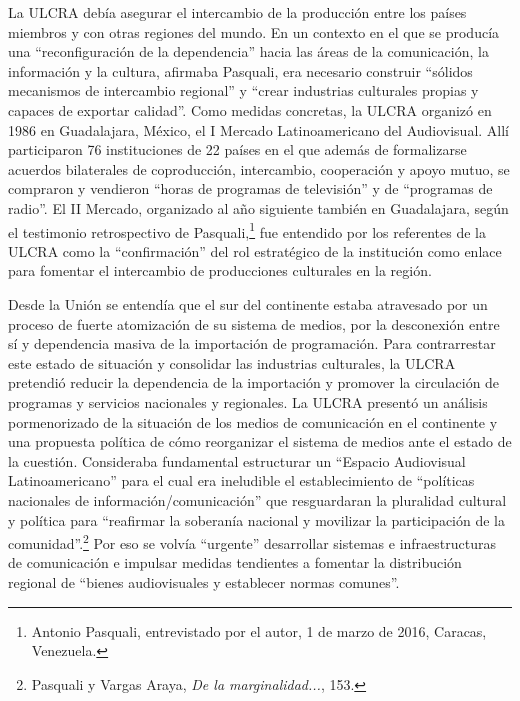 \documentclass{tufte-handout}
\begin{document}
La ULCRA debía asegurar el intercambio de la producción entre los países
miembros y con otras regiones del mundo. En un contexto en el que se
producía una ``reconfiguración de la dependencia'' hacia las áreas de la
comunicación, la información y la cultura, afirmaba Pasquali, era
necesario construir ``sólidos mecanismos de intercambio regional'' y
``crear industrias culturales propias y capaces de exportar calidad''.
Como medidas concretas, la ULCRA organizó en 1986 en Guadalajara,
México, el I Mercado Latinoamericano del Audiovisual. Allí participaron
76 instituciones de 22 países en el que además de formalizarse acuerdos
bilaterales de coproducción, intercambio, cooperación y apoyo mutuo, se
compraron y vendieron ``horas de programas de televisión'' y de
``programas de radio''. El II Mercado, organizado al año siguiente
también en Guadalajara, según el testimonio retrospectivo de
Pasquali,\footnote{Antonio Pasquali, entrevistado por el autor, 1 de
  marzo de 2016, Caracas, Venezuela.} fue entendido por los referentes
de la ULCRA como la ``confirmación'' del rol estratégico de la
institución como enlace para fomentar el intercambio de producciones
culturales en la región.

Desde la Unión se entendía que el sur del continente estaba atravesado
por un proceso de fuerte atomización de su sistema de medios, por la
desconexión entre sí y dependencia masiva de la importación de
programación. Para contrarrestar este estado de situación y consolidar
las industrias culturales, la ULCRA pretendió reducir la dependencia de
la importación y promover la circulación de programas y servicios
nacionales y regionales. La ULCRA presentó un análisis pormenorizado de
la situación de los medios de comunicación en el continente y una
propuesta política de cómo reorganizar el sistema de medios ante el
estado de la cuestión. Consideraba fundamental estructurar un ``Espacio
Audiovisual Latinoamericano'' para el cual era ineludible el
establecimiento de ``políticas nacionales de información/comunicación''
que resguardaran la pluralidad cultural y política para ``reafirmar la
soberanía nacional y movilizar la participación de la
comunidad''.\footnote{Pasquali y Vargas Araya, \emph{De la
  marginalidad...}, 153.} Por eso se volvía ``urgente'' desarrollar
sistemas e infraestructuras de comunicación e impulsar medidas
tendientes a fomentar la distribución regional de ``bienes audiovisuales
y establecer normas comunes''.
\end{document}
